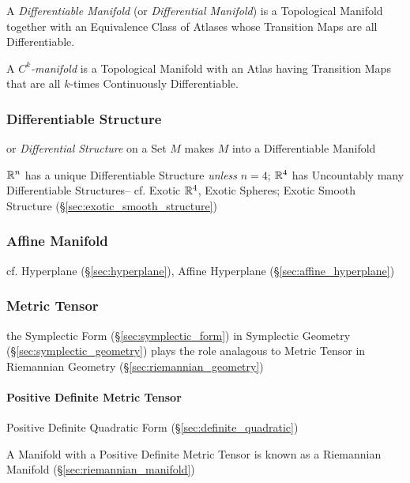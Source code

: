 A \emph{Differentiable Manifold} (or \emph{Differential Manifold}) is a
Topological Manifold together with an Equivalence Class of Atlases whose
Transition Maps are all Differentiable.

A \emph{$C^k$-manifold} is a Topological Manifold with an Atlas having
Transition Maps that are all $k$-times Continuously Differentiable.



\subsubsection{Differentiable Structure}\label{sec:differentiable_structure}

or \emph{Differential Structure} on a Set $M$ makes $M$ into a Differentiable
Manifold

$\mathbb{R}^n$ has a unique Differentiable Structure \emph{unless} $n = 4$;
$\mathbb{R}^4$ has Uncountably many Differentiable Structures-- cf. Exotic
$\mathbb{R}^4$, Exotic Spheres; Exotic Smooth Structure
(\S\ref{sec:exotic_smooth_structure})



\subsubsection{Affine Manifold}\label{sec:affine_manifold}

cf. Hyperplane (\S\ref{sec:hyperplane}), Affine Hyperplane
(\S\ref{sec:affine_hyperplane})



\subsubsection{Metric Tensor}\label{sec:metric_tensor}

the Symplectic Form (\S\ref{sec:symplectic_form}) in Symplectic Geometry
(\S\ref{sec:symplectic_geometry}) plays the role analagous to Metric Tensor in
Riemannian Geometry (\S\ref{sec:riemannian_geometry})



\paragraph{Positive Definite Metric Tensor}
\label{sec:positive_definite_metric_tensor}\hfill

Positive Definite Quadratic Form (\S\ref{sec:definite_quadratic})

A Manifold with a Positive Definite Metric Tensor is known as a
Riemannian Manifold (\S\ref{sec:riemannian_manifold})



